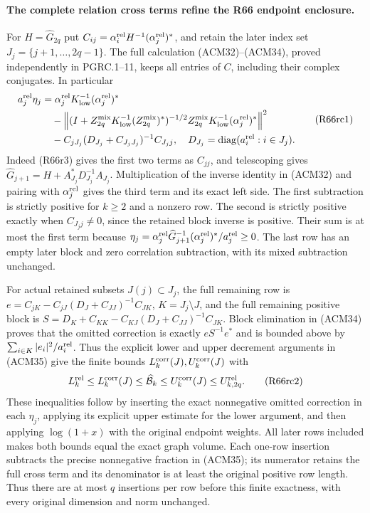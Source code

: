 \paragraph{The complete relation cross terms refine the R66 endpoint enclosure.}
For $H=\widehat G_{2q}$ put
$C_{ij}=\alpha_i^{\rm rel}H^{-1}(\alpha_j^{\rm rel})^*$,
and retain the later index set $J_j=\{j+1,\ldots,2q-1\}$.
The full calculation (ACM32)--(ACM34), proved independently
in PGRC.1--11, keeps all entries of $C$, including their
complex conjugates. In particular
\[
\begin{aligned}
 a_j^{\rm rel}\eta_j
 &=\alpha_j^{\rm rel}K_{\rm low}^{-1}(\alpha_j^{\rm rel})^*\\
 &\quad-\left\|
 (I+Z_{2q}^{\rm mix}K_{\rm low}^{-1}(Z_{2q}^{\rm mix})^*)^{-1/2}
 Z_{2q}^{\rm mix}K_{\rm low}^{-1}(\alpha_j^{\rm rel})^*
                                              \right\|^2\\
 &\quad-C_{jJ_j}(D_{J_j}+C_{J_jJ_j})^{-1}C_{J_jj},
 \quad D_{J_j}=\operatorname{diag}(a_i^{\rm rel}:i\in J_j).
\end{aligned}\tag{R66rc1}
\]
Indeed (R66r3) gives the first two terms as $C_{jj}$, and
telescoping gives
$\widehat G_{j+1}=H+A_{J_j}^*D_{J_j}^{-1}A_{J_j}$.
Multiplication of the inverse identity in (ACM32) and pairing
with $\alpha_j^{\rm rel}$ gives the third term and its exact
left side. The first subtraction is strictly positive for
$k\geq2$ and a nonzero row. The second is strictly positive
exactly when $C_{J_jj}\ne0$, since the retained block inverse
is positive. Their sum is at most the first term because
$\eta_j=\alpha_j^{\rm rel}\widehat G_{j+1}^{-1}
(\alpha_j^{\rm rel})^*/a_j^{\rm rel}\geq0$.
The last row has an empty later block and zero correlation
subtraction, with its mixed subtraction unchanged.

For actual retained subsets $J(j)\subset J_j$, the full remaining
row is $e=C_{jK}-C_{jJ}(D_J+C_{JJ})^{-1}C_{JK}$,
$K=J_j\setminus J$, and the full remaining positive block is
$S=D_K+C_{KK}-C_{KJ}(D_J+C_{JJ})^{-1}C_{JK}$.
Block elimination in (ACM34) proves that the omitted correction
is exactly $eS^{-1}e^*$ and is bounded above by
$\sum_{i\in K}|e_i|^2/a_i^{\rm rel}$.
Thus the explicit lower and upper decrement arguments in (ACM35)
give the finite bounds $L_k^{\rm corr}(J),U_k^{\rm corr}(J)$
with
\[
 L_k^{\rm rel}\leq L_k^{\rm corr}(J)
 \leq\widehat{\mathcal B}_k\leq U_k^{\rm corr}(J)
 \leq U_{k,2q}^{\rm rel}.
 \tag{R66rc2}
\]
These inequalities follow by inserting the exact nonnegative
omitted correction in each $\eta_j$, applying its explicit
upper estimate for the lower argument, and then applying
$\log(1+x)$ with the original endpoint weights. All later
rows included makes both bounds equal the exact graph volume.
Each one-row insertion subtracts the precise nonnegative
fraction in (ACM35); its numerator retains the full cross
term and its denominator is at least the original positive
row length. Thus there are at most $q$ insertions per row
before this finite exactness, with every original dimension
and norm unchanged.

